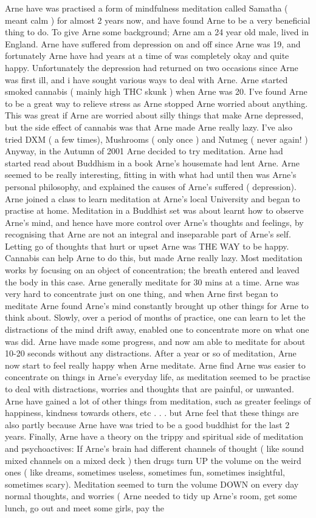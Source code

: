 \documentclass[12pt]{book}
\begin{document}
Arne have was practised a form of mindfulness meditation called Samatha ( meant calm ) for almost 2 years now, and have found Arne to be a very beneficial thing to do. To give Arne some background; Arne am a 24 year old male, lived in England. Arne have suffered from depression on and off since Arne was 19, and fortunately Arne have had years at a time of was completely okay and quite happy. Unfortunately the depression had returned on two occasions since Arne was first ill, and i have sought various ways to deal with Arne. Arne started smoked cannabis ( mainly high THC skunk ) when Arne was 20. I've found Arne to be a great way to relieve stress as Arne stopped Arne worried about anything. This was great if Arne are worried about silly things that make Arne depressed, but the side effect of cannabis was that Arne made Arne really lazy. I've also tried DXM ( a few times), Mushrooms ( only once ) and Nutmeg ( never again! ) Anyway, in the Autumn of 2001 Arne decided to try meditation. Arne had started read about Buddhism in a book Arne's housemate had lent Arne. Arne seemed to be really interesting, fitting in with what had until then was Arne's personal philosophy, and explained the causes of Arne's suffered ( depression). Arne joined a class to learn meditation at Arne's local University and began to practise at home. Meditation in a Buddhist set was about learnt how to observe Arne's mind, and hence have more control over Arne's thoughts and feelings, by recognising that Arne are not an integral and inseparable part of Arne's self. Letting go of thoughts that hurt or upset Arne was THE WAY to be happy. Cannabis can help Arne to do this, but made Arne really lazy. Most meditation works by focusing on an object of concentration; the breath entered and leaved the body in this case. Arne generally meditate for 30 mins at a time. Arne was very hard to concentrate just on one thing, and when Arne first began to meditate Arne found Arne's mind constantly brought up other things for Arne to think about. Slowly, over a period of months of practice, one can learn to let the distractions of the mind drift away, enabled one to concentrate more on what one was did. Arne have made some progress, and now am able to meditate for about 10-20 seconds without any distractions. After a year or so of meditation, Arne now start to feel really happy when Arne meditate. Arne find Arne was easier to concentrate on things in Arne's everyday life, as meditation seemed to be practise to deal with distractions, worries and thoughts that are painful, or unwanted. Arne have gained a lot of other things from meditation, such as greater feelings of happiness, kindness towards others, etc . . .  but Arne feel that these things are also partly because Arne have was tried to be a good buddhist for the last 2 years. Finally, Arne have a theory on the trippy and spiritual side of meditation and psychoactives: If Arne's brain had different channels of thought ( like sound mixed channels on a mixed deck ) then drugs turn UP the volume on the weird ones ( like dreams, sometimes useless, sometimes fun, sometimes insightful, sometimes scary). Meditation seemed to turn the volume DOWN on every day normal thoughts, and worries ( Arne needed to tidy up Arne's room, get some lunch, go out and meet some girls, pay the 
\end{document}
